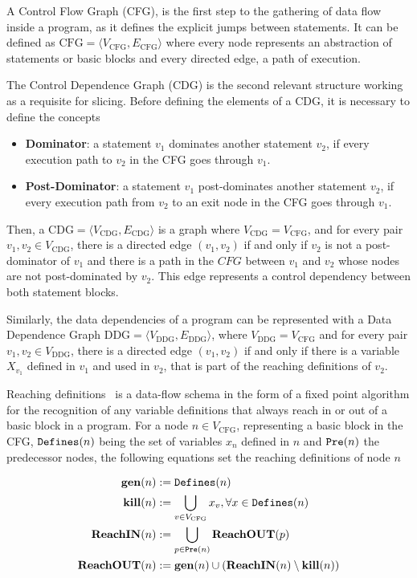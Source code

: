 \documentclass[%
  chapterprefix=false,%
  open=right,%
  twoside=true,%
  paper=a4,%
  logofile={Figures/logo.png},%
  thesistype=master,%
  UKenglish,%
]{se2thesis}
\newcommand{\callable}[2][]{\(\text{\texttt{#2}}(#1)\)}
\begin{document}
A Control Flow Graph (CFG), is the first step to the gathering of data flow inside a program, as it defines the explicit jumps between statements.
It can be defined as \(\text{CFG} = \langle V_{\text{CFG}}, E_{\text{CFG}} \rangle\) where every node represents an abstraction of statements or basic blocks and every directed edge, a path of execution.

The Control Dependence Graph (CDG) is the second relevant structure working as a requisite for slicing.
Before defining the elements of a CDG, it is necessary to define the concepts
\begin{itemize}
  \item \textbf{Dominator}: a statement \(v_1\) dominates another statement \(v_2\), if every execution path to \(v_2\) in the CFG goes through \(v_1\).
  \item \textbf{Post-Dominator}: a statement \(v_1\) post-dominates another statement \(v_2\), if every execution path from \(v_2\) to an exit node in the CFG goes through \(v_1\).
\end{itemize}
Then, a \(\text{CDG} = \langle V_{\text{CDG}}, E_{\text{CDG}} \rangle\) is a graph where \(V_{\text{CDG}} = V_{\text{CFG}}\), and for every pair \(v_1, v_2 \in V_{\text{CDG}}\), there is a directed edge \((v_1, v_2)\) if and only if \(v_2\) is not a post-dominator of \(v_1\) and there is a path in the \(CFG\) between \(v_1\) and \(v_2\) whose nodes are not post-dominated by \(v_2\).
This edge represents a control dependency between both statement blocks.

Similarly, the data dependencies of a program can be represented with a Data Dependence Graph \(\text{DDG} = \langle V_{\text{DDG}}, E_{\text{DDG}} \rangle\), where \(V_{\text{DDG}} = V_{\text{CFG}}\) and for every pair \(v_1, v_2 \in V_{\text{DDG}}\), there is a directed edge \((v_1, v_2)\) if and only if there is a variable \(X_{v_1}\) defined in \(v_1\) and used in \(v_2\), that is part of the reaching definitions of \(v_2\).

Reaching definitions~\cite{DBLP:books/aw/AhoSU86} is a data-flow schema in the form of a fixed point algorithm for the recognition of any variable definitions that always reach in or out of a basic block in a program.
For a node \(n \in V_{\text{CFG}}\), representing a basic block in the CFG, \callable[n]{Defines} being the set of variables \(x_n\) defined in \(n\) and \callable[n]{Pre} the predecessor nodes, the following equations set the reaching definitions of node \(n\)

\begin{align*}
  \text{\textbf{gen}}(n) &:= \text{\callable[n]{Defines}} \\
  \text{\textbf{kill}}(n) &:= \bigcup_{v \in V_{\text{CFG}}} x_v, \forall x \in \text{\callable[n]{Defines}} \\
  \text{\textbf{ReachIN}}(n) &:= \bigcup_{p \in \text{\callable[n]{Pre}}} \text{\textbf{ReachOUT}}(p) \\
  \text{\textbf{ReachOUT}}(n) &:= \text{\textbf{gen}}(n) \cup (\text{\textbf{ReachIN}}(n) \setminus \text{\textbf{kill}}(n))\\
\end{align*}
\end{document}
